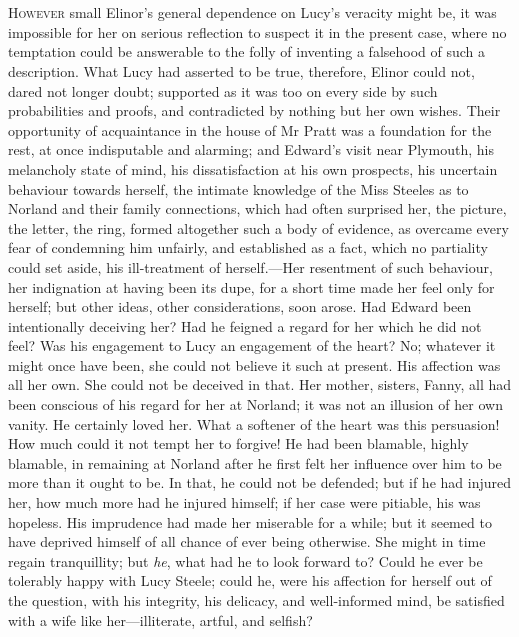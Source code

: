 \chapter[Chapter \thechapter]{}
\lettrine[lraise=0.3]{H}{owever} small Elinor's general dependence on Lucy's veracity might be, it was impossible for her on serious reflection to suspect it in the present case, where no temptation could be answerable to the folly of inventing a falsehood of such a description. What Lucy had asserted to be true, therefore, Elinor could not, dared not longer doubt; supported as it was too on every side by such probabilities and proofs, and contradicted by nothing but her own wishes. Their opportunity of acquaintance in the house of Mr Pratt was a foundation for the rest, at once indisputable and alarming; and Edward's visit near Plymouth, his melancholy state of mind, his dissatisfaction at his own prospects, his uncertain behaviour towards herself, the intimate knowledge of the Miss Steeles as to Norland and their family connections, which had often surprised her, the picture, the letter, the ring, formed altogether such a body of evidence, as overcame every fear of condemning him unfairly, and established as a fact, which no partiality could set aside, his ill-treatment of herself.—Her resentment of such behaviour, her indignation at having been its dupe, for a short time made her feel only for herself; but other ideas, other considerations, soon arose. Had Edward been intentionally deceiving her? Had he feigned a regard for her which he did not feel? Was his engagement to Lucy an engagement of the heart? No; whatever it might once have been, she could not believe it such at present. His affection was all her own. She could not be deceived in that. Her mother, sisters, Fanny, all had been conscious of his regard for her at Norland; it was not an illusion of her own vanity. He certainly loved her. What a softener of the heart was this persuasion! How much could it not tempt her to forgive! He had been blamable, highly blamable, in remaining at Norland after he first felt her influence over him to be more than it ought to be. In that, he could not be defended; but if he had injured her, how much more had he injured himself; if her case were pitiable, his was hopeless. His imprudence had made her miserable for a while; but it seemed to have deprived himself of all chance of ever being otherwise. She might in time regain tranquillity; but \textit{he}, what had he to look forward to? Could he ever be tolerably happy with Lucy Steele; could he, were his affection for herself out of the question, with his integrity, his delicacy, and well-informed mind, be satisfied with a wife like her—illiterate, artful, and selfish?

